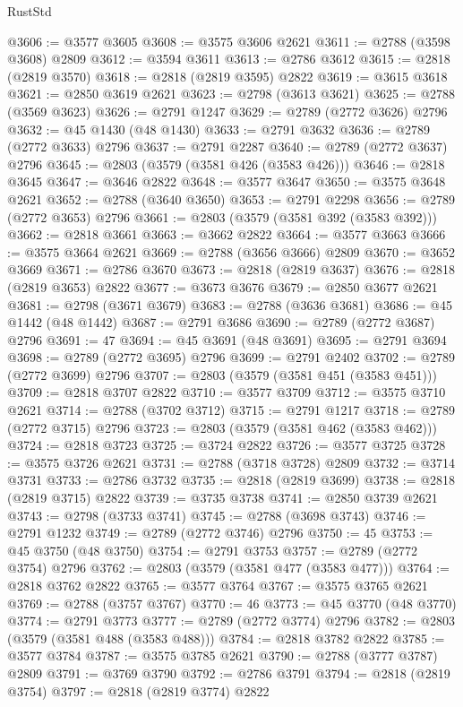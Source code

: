 \begin{lexlean}{RustStd}
\begin{coremodule}
@3606 := @3577 @3605
@3608 := @3575 @3606 @2621
@3611 := @2788 (@3598 @3608) @2809
@3612 := @3594 @3611
@3613 := @2786 @3612
@3615 := @2818 (@2819 @3570)
@3618 := @2818 (@2819 @3595) @2822
@3619 := @3615 @3618
@3621 := @2850 @3619 @2621
@3623 := @2798 (@3613 @3621)
@3625 := @2788 (@3569 @3623)
@3626 := @2791 @1247
@3629 := @2789 (@2772 @3626) @2796
@3632 := @45 @1430 (@48 @1430)
@3633 := @2791 @3632
@3636 := @2789 (@2772 @3633) @2796
@3637 := @2791 @2287
@3640 := @2789 (@2772 @3637) @2796
@3645 := @2803 (@3579 (@3581 @426 (@3583 @426)))
@3646 := @2818 @3645
@3647 := @3646 @2822
@3648 := @3577 @3647
@3650 := @3575 @3648 @2621
@3652 := @2788 (@3640 @3650)
@3653 := @2791 @2298
@3656 := @2789 (@2772 @3653) @2796
@3661 := @2803 (@3579 (@3581 @392 (@3583 @392)))
@3662 := @2818 @3661
@3663 := @3662 @2822
@3664 := @3577 @3663
@3666 := @3575 @3664 @2621
@3669 := @2788 (@3656 @3666) @2809
@3670 := @3652 @3669
@3671 := @2786 @3670
@3673 := @2818 (@2819 @3637)
@3676 := @2818 (@2819 @3653) @2822
@3677 := @3673 @3676
@3679 := @2850 @3677 @2621
@3681 := @2798 (@3671 @3679)
@3683 := @2788 (@3636 @3681)
@3686 := @45 @1442 (@48 @1442)
@3687 := @2791 @3686
@3690 := @2789 (@2772 @3687) @2796
@3691 := 47
@3694 := @45 @3691 (@48 @3691)
@3695 := @2791 @3694
@3698 := @2789 (@2772 @3695) @2796
@3699 := @2791 @2402
@3702 := @2789 (@2772 @3699) @2796
@3707 := @2803 (@3579 (@3581 @451 (@3583 @451)))
@3709 := @2818 @3707 @2822
@3710 := @3577 @3709
@3712 := @3575 @3710 @2621
@3714 := @2788 (@3702 @3712)
@3715 := @2791 @1217
@3718 := @2789 (@2772 @3715) @2796
@3723 := @2803 (@3579 (@3581 @462 (@3583 @462)))
@3724 := @2818 @3723
@3725 := @3724 @2822
@3726 := @3577 @3725
@3728 := @3575 @3726 @2621
@3731 := @2788 (@3718 @3728) @2809
@3732 := @3714 @3731
@3733 := @2786 @3732
@3735 := @2818 (@2819 @3699)
@3738 := @2818 (@2819 @3715) @2822
@3739 := @3735 @3738
@3741 := @2850 @3739 @2621
@3743 := @2798 (@3733 @3741)
@3745 := @2788 (@3698 @3743)
@3746 := @2791 @1232
@3749 := @2789 (@2772 @3746) @2796
@3750 := 45
@3753 := @45 @3750 (@48 @3750)
@3754 := @2791 @3753
@3757 := @2789 (@2772 @3754) @2796
@3762 := @2803 (@3579 (@3581 @477 (@3583 @477)))
@3764 := @2818 @3762 @2822
@3765 := @3577 @3764
@3767 := @3575 @3765 @2621
@3769 := @2788 (@3757 @3767)
@3770 := 46
@3773 := @45 @3770 (@48 @3770)
@3774 := @2791 @3773
@3777 := @2789 (@2772 @3774) @2796
@3782 := @2803 (@3579 (@3581 @488 (@3583 @488)))
@3784 := @2818 @3782 @2822
@3785 := @3577 @3784
@3787 := @3575 @3785 @2621
@3790 := @2788 (@3777 @3787) @2809
@3791 := @3769 @3790
@3792 := @2786 @3791
@3794 := @2818 (@2819 @3754)
@3797 := @2818 (@2819 @3774) @2822

\end{coremodule}
\end{lexlean}
